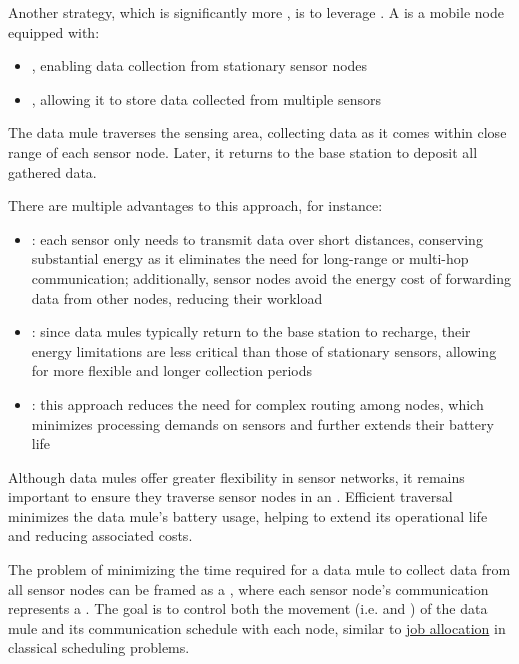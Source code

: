 \documentclass[a4paper, 12pt]{report}
\begin{document}
    Another strategy, which is significantly more , is to leverage . A  is a mobile node equipped with:

    \begin{itemize}
        \item {}, enabling data collection from stationary sensor nodes
        \item {}, allowing it to store data collected from multiple sensors
    \end{itemize}

    The data mule traverses the sensing area, collecting data as it comes within close range of each sensor node. Later, it returns to the base station to deposit all gathered data.

    There are multiple advantages to this approach, for instance:

    \begin{itemize}
        \item {}: each sensor only needs to transmit data over short distances, conserving substantial energy as it eliminates the need for long-range or multi-hop communication; additionally, sensor nodes avoid the energy cost of forwarding data from other nodes, reducing their workload
        \item {}: since data mules typically return to the base station to recharge, their energy limitations are less critical than those of stationary sensors, allowing for more flexible and longer collection periods
        \item {}: this approach reduces the need for complex routing among nodes, which minimizes processing demands on sensors and further extends their battery life
    \end{itemize}

    Although data mules offer greater flexibility in sensor networks, it remains important to ensure they traverse sensor nodes in an . Efficient traversal minimizes the data mule's battery usage, helping to extend its operational life and reducing associated costs.

    The problem of minimizing the time required for a data mule to collect data from all sensor nodes can be framed as a , where each sensor node's communication represents a . The goal is to control both the movement (i.e.  and ) of the data mule and its communication schedule with each node, similar to \href{https://en.wikipedia.org/wiki/Optimal_job_scheduling}{job allocation} in classical scheduling problems.
\end{document}
